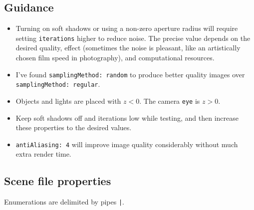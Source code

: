 \documentclass{article}
\begin{document}
\subsection{Guidance}

\begin{itemize}
    \item Turning on soft shadows or using a non-zero aperture radius will require setting \texttt{iterations} higher to reduce noise. The precise value depends on the desired quality, effect (sometimes the noise is pleasant, like an artistically chosen film speed in photography), and computational resources.
    \item I've found \texttt{samplingMethod: random} to produce better quality images over \texttt{samplingMethod: regular}.
    \item Objects and lights are placed with $z < 0$. The camera \texttt{eye} is $z > 0$.
    \item Keep soft shadows off and iterations low while testing, and then increase these properties to the desired values.
    \item \texttt{antiAliasing: 4} will improve image quality considerably without much extra render time.
\end{itemize}

\subsection{Scene file properties}

Enumerations are delimited by pipes \texttt{|}.\\\\
\end{document}
